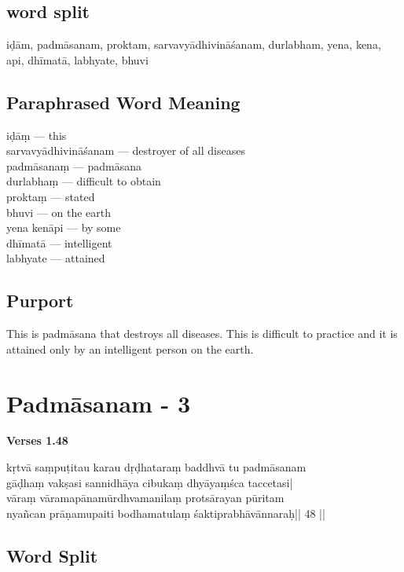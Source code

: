 \subsection*{word split}

iḍām,  padmāsanam, proktam, sarvavyādhivināśanam,  durlabham, yena, kena, api, dhīmatā, labhyate, bhuvi

\subsection*{Paraphrased Word Meaning}

\begin{multicols}{2}
iḍāṃ ---  this  \\
sarvavyādhivināśanam --- destroyer of all diseases  \\
padmāsanaṃ ---  padmāsana \\
durlabhaṃ ---  difficult to obtain \\ 
proktaṃ ---  stated  \\
bhuvi --- on the earth  \\
yena kenāpi ---  by some  \\
dhīmatā ---  intelligent  \\
labhyate --- attained
\end{multicols}

\subsection*{Purport}

This is padmāsana that destroys all diseases. This is difficult to practice and it is attained only by an intelligent person on the earth.

\section*{Padmāsanam - 3}

\noindent \textbf{Verses 1.48}

\begin{shloka}
kṛtvā saṃpuṭitau karau  dṛḍhataraṃ baddhvā tu padmāsanam\\
gāḍhaṃ vakṣasi sannidhāya cibukaṃ dhyāyaṃśca taccetasi|\\
vāraṃ vāramapānamūrdhvamanilaṃ protsārayan pūritam\\
nyañcan prāṇamupaiti bodhamatulaṃ śaktiprabhāvānnaraḥ|| 48 ||
\end{shloka}

\subsection*{Word Split}

